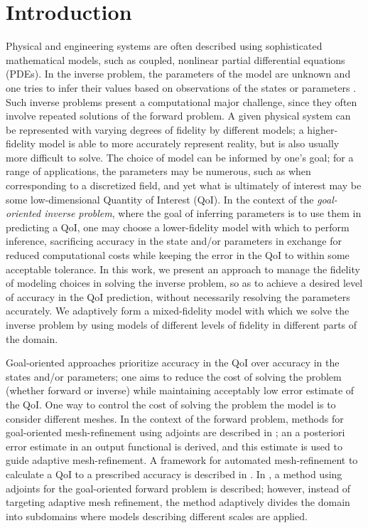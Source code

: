 \section{Introduction}

Physical and engineering systems are often described using sophisticated mathematical models, such as coupled, nonlinear partial differential equations (PDEs). In the inverse problem, the parameters of the model are unknown and one tries to infer their values based on observations of the states or parameters \cite{Taran05, BanksKuhn89}. Such inverse problems present a computational major challenge, since they often involve repeated solutions of the forward problem. A given physical system can be represented with varying degrees of fidelity by different models; a higher-fidelity model is able to more accurately represent reality, but is also usually more difficult to solve. The choice of model can be informed by one's goal; for a range of applications, the parameters may be numerous, such as when corresponding to a discretized field, and yet what is ultimately of interest may be some low-dimensional Quantity of Interest (QoI). In the context of the \textit{goal-oriented inverse problem}, where the goal of inferring parameters is to use them in predicting a QoI, one may choose a lower-fidelity model with which to perform inference, sacrificing accuracy in the state and/or parameters in exchange for reduced computational costs while keeping the error in the QoI to within some acceptable tolerance.  In this work, we present an approach to manage the fidelity of modeling choices in solving the inverse problem, so as to achieve a desired level of accuracy in the QoI prediction, without necessarily resolving the parameters accurately. We adaptively form a mixed-fidelity model with which we solve the inverse problem by using models of different levels of fidelity in different parts of the domain.

Goal-oriented approaches prioritize accuracy in the QoI over accuracy in the states and/or parameters; one aims to reduce the cost of solving the problem (whether forward or inverse) while maintaining acceptably low error estimate of the QoI. One way to control the cost of solving the problem the model is to consider different meshes. In the context of the forward problem, methods for goal-oriented mesh-refinement using adjoints are described in \cite{PrudOden99,VendDarm00,BecRann01}; an a posteriori error estimate in an output functional is derived, and this estimate is used to guide adaptive mesh-refinement. A framework for automated mesh-refinement to calculate a QoI to a prescribed accuracy is described in \cite{Yano12}. In \cite{OdenPrudetal06}, a method using adjoints for the goal-oriented forward problem is described; however, instead of targeting adaptive mesh refinement, the method adaptively divides the domain into subdomains where models describing different scales are applied.


